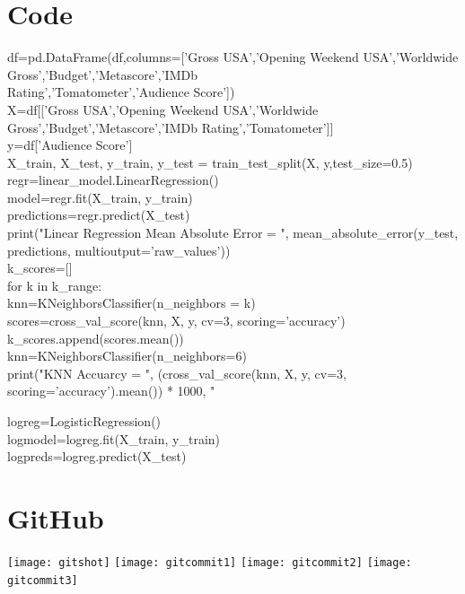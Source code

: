 \documentclass[10pt,twocolumn,letterpaper]{article}
\begin{document}
\section{Code}
	df=pd.DataFrame(df,columns=['Gross USA','Opening Weekend USA','Worldwide Gross','Budget','Metascore','IMDb\\ Rating','Tomatometer','Audience Score'])\\
	
	X=df[['Gross USA','Opening Weekend USA','Worldwide Gross','Budget','Metascore','IMDb Rating','Tomatometer']]\\
	y=df['Audience Score']\\
	
	X\_train, X\_test, y\_train, y\_test = train\_test\_split(X, y,test\_size=0.5)\\
	
	regr=linear\_model.LinearRegression()\\
	model=regr.fit(X\_train, y\_train)\\
	predictions=regr.predict(X\_test)\\
	
	print("Linear Regression Mean Absolute Error = ", mean\_absolute\_error(y\_test, predictions, multioutput='raw\_values'))\\
	
	k\_scores=[]\\
	for k in k\_range:\\
	knn=KNeighborsClassifier(n\_neighbors = k)\\
	scores=cross\_val\_score(knn, X, y, cv=3, scoring='accuracy')\\
	k\_scores.append(scores.mean())\\
	
	knn=KNeighborsClassifier(n\_neighbors=6)\\
	print("KNN Accuarcy = ", (cross\_val\_score(knn, X, y, cv=3, scoring='accuracy').mean()) * 1000, "%
	
	logreg=LogisticRegression()\\
	logmodel=logreg.fit(X\_train, y\_train)\\
	logpreds=logreg.predict(X\_test)\\
	
\section{GitHub}
	\begin{center}
		\texttt{[image: gitshot]}
		\texttt{[image: gitcommit1]}
		\texttt{[image: gitcommit2]}
		\texttt{[image: gitcommit3]}
	\end{center}
\end{document}
